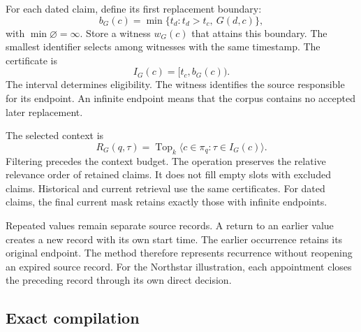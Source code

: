 For each dated claim, define its first replacement boundary:
\begin{equation}
b_G(c)=\min\{t_d:t_d>t_c,\ G(d,c)\},
\label{eq:boundary}
\end{equation}
with $\min\varnothing=\infty$.
Store a witness $w_G(c)$ that attains this boundary.
The smallest identifier selects among witnesses with the same timestamp.
The certificate is
\begin{equation}
I_G(c)=[t_c,b_G(c)).
\label{eq:certificate}
\end{equation}
The interval determines eligibility.
The witness identifies the source responsible for its endpoint.
An infinite endpoint means that the corpus contains no accepted later replacement.

The selected context is
\begin{equation}
R_G(q,\tau)=\operatorname{Top}_k\langle c\in\pi_q:\tau\in I_G(c)\rangle.
\label{eq:context}
\end{equation}
Filtering precedes the context budget.
The operation preserves the relative relevance order of retained claims.
It does not fill empty slots with excluded claims.
Historical and current retrieval use the same certificates.
For dated claims, the final current mask retains exactly those with infinite endpoints.

Repeated values remain separate source records.
A return to an earlier value creates a new record with its own start time.
The earlier occurrence retains its original endpoint.
The method therefore represents recurrence without reopening an expired source record.
For the Northstar illustration, each appointment closes the preceding record through its own direct decision.

\subsection{Exact compilation}

